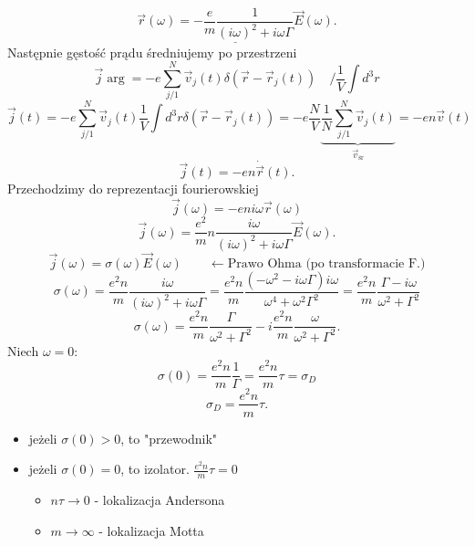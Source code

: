 \begin{equation}
\underline{\vec{r}(\omega) = -\dfrac{e}{m} \dfrac{1}{(i\omega)^2+ 
i\omega\Gamma} \vec{E}(\omega)}.
\end{equation}
Następnie gęstość prądu średniujemy po przestrzeni
$$ \vec{j} \arg = -e \sum_{j/1}^N \vec{v}_j(t)\delta(\vec{r}-\vec{r}_j(t))
\quad / \dfrac{1}{V} \int d^3r$$
$$ \vec{j} (t) = -e\sum_{j/1}^N \vec{v}_j(t) \frac{1}{V}\int d^3r \delta(\vec{r}
- \vec{r}_j(t)) = -e\dfrac{N}{V} \underbrace{\dfrac{1}{N} \sum_{j/1}^N 
\vec{v}_j(t)}_{\vec{v}_{\mbox{śr}}} = -en\vec{v}(t)$$
$$ \vec{j}(t) = -en\dot{\vec{r}}(t).$$
Przechodzimy do reprezentacji fourierowskiej
$$
\vec{j}(\omega) = -eni\omega \vec{r}(\omega)
$$
\begin{equation}
\vec{j}(\omega) = \dfrac{e^2}{m} n \dfrac{i\omega}{(i\omega)^2+i\omega\Gamma} 
\vec{E}(\omega).
\end{equation}
\begin{equation}
\vec{j}(\omega) = \sigma(\omega) \vec{E}(\omega) \qquad \leftarrow 
\mbox{Prawo Ohma (po transformacie F.)}
\end{equation}
$$ \sigma(\omega) = \frac{e^2n}{m} \dfrac{i\omega}{(i\omega)^2+i\omega\Gamma} =
 \frac{e^2n}{m} \dfrac{(-\omega^2-i\omega\Gamma)i
 \omega}{\omega^4+\omega^2\Gamma^2}=\frac{e^2n}{m}\dfrac{\Gamma-
 i\omega}{\omega^2+
 \Gamma^2}  $$
\begin{equation} \sigma(\omega) = \frac{e^2n}{m}\dfrac{\Gamma}{\omega^2+
 \Gamma^2} - i\frac{e^2n}{m}\dfrac{\omega}{\omega^2+\Gamma^2}.\end{equation}
 Niech $\omega=0$:
 $$ \sigma (0) = \frac{e^2n}{m} \frac{1}{\Gamma} =  \frac{e^2n}{m}\tau 
 =\sigma_D $$
 \begin{equation}
 \sigma_D = \dfrac{e^2n}{m} \tau.
 \end{equation}
 \begin{itemize}
 \item jeżeli $\sigma(0) > 0$, to "przewodnik"
 \item jeżeli $\sigma(0) = 0$, to izolator.  
 $\frac{e^2n}{m}\tau=0 $\begin{itemize} \item $n\tau \to 0$ - lokalizacja
 Andersona \item $m\to \infty $ - lokalizacja Motta \end{itemize}
 \end{itemize}

